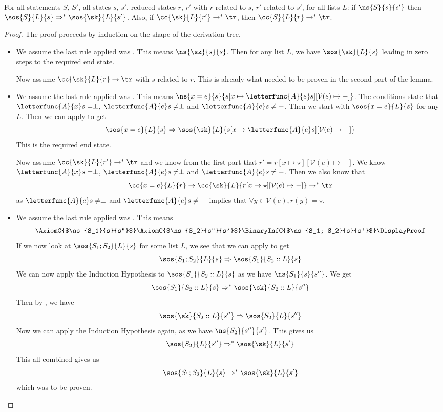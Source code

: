 \begin{lemma}
\label{nsimpsos}
For all statements $S$, $S'$, all states $s$, $s'$, reduced states $r$, $r'$ with $r$ related to $s$, $r'$ related to $s'$, for all lists $L$: if $\ns{S}{s}{s'}$ then $\sos{S}{L}{s} \Rightarrow ^{*} \sos{\sk}{L}{s'}$. Also, if $\cc{\sk}{L}{r'} \to ^{*} \tr$, then $\cc{S}{L}{r} \to ^{*} \tr$.
\end{lemma}
\begin{proof}
The proof proceeds by induction on the shape of the derivation tree. 
\begin{itemize}[noitemsep]
    \item We assume the last rule applied was \skipns. This means $\ns{\sk}{s}{s}$. Then for any list $L$, we have $\sos{\sk}{L}{s}$ leading in zero steps to the required end state. 
    
    Now assume $\cc{\sk}{L}{r} \to \tr$ with $s$ related to $r$. This is already what needed to be proven in the second part of the lemma. 
    \item We assume the last rule applied was \assns. This means $\ns{x=e}{s}{s[x\mapsto\letterfunc{A}{e}s][\mathcal{V}(e)\mapsto -]}$. The conditions state that $\letterfunc{A}{x}s = \perp$, $\letterfunc{A}{e}s \neq \perp$ and $\letterfunc{A}{e}s \neq -$. Then we start with $\sos{x=e}{L}{s}$ for any $L$. Then we can apply \asssos to get 
    $$\sos{x=e}{L}{s} \Rightarrow \sos{\sk}{L}{s[x\mapsto\letterfunc{A}{e}s][\mathcal{V}(e)\mapsto -]}$$ 
    This is the required end state. 
    
    Now assume $\cc{\sk}{L}{r'} \to ^{*} \tr$ and we know from the first part that $r' = r[x\mapsto\star][\mathcal{V}(e)\mapsto -]$. We know $\letterfunc{A}{x}s = \perp$, $\letterfunc{A}{e}s \neq \perp$ and $\letterfunc{A}{e}s \neq -$. 
    Then we also know that 
    $$\cc{x=e}{L}{r} \to \cc{\sk}{L}{r[x\mapsto \star ][\mathcal{V}(e)\mapsto -]} \to ^{*} \tr$$
    as $\letterfunc{A}{e}s \neq \perp$ and $\letterfunc{A}{e}s \neq -$ implies that $\forall y \in \mathcal{V}(e), r(y) = \star $.
%    
    \item We assume the last rule applied was \compns. This means
    $$\centering \AxiomC{$\ns{S_1}{s}{s''}$}
\AxiomC{$\ns{S_2}{s''}{s'}$}
\BinaryInfC{$\ns{S_1; S_2}{s}{s'}$}
\DisplayProof$$
    If we now look at $\sos{S_1;S_2}{L}{s}$ for some list $L$, we see that we can apply \compsos to get 
    $$\sos{S_1;S_2}{L}{s} \Rightarrow \sos{S_1}{S_2::L}{s}$$
    We can now apply the Induction Hypothesis to $\sos{S_1}{S_2::L}{s}$ as we have $\ns{S_1}{s}{s''}$. We get 
    $$\sos{S_1}{S_2::L}{s} \Rightarrow ^{*} \sos{\sk}{S_2::L}{s''} $$
    Then by \loadsos, we have 
    $$\sos{\sk}{S_2::L}{s''} \Rightarrow \sos{S_2}{L}{s''}$$
    Now we can apply the Induction Hypothesis again, as we have $\ns{S_2}{s''}{s'}$. This gives us
    $$\sos{S_2}{L}{s''} \Rightarrow ^{*} \sos{\sk}{L}{s'}$$
    This all combined gives us
    $$\sos{S_1;S_2}{L}{s} \Rightarrow ^{*} \sos{\sk}{L}{s'}$$
    which was to be proven.
    

\end{itemize}
\end{proof}

